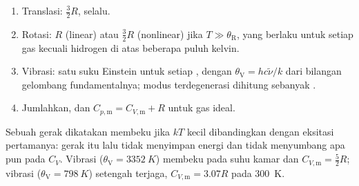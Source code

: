 \begin{method}\label{met:b3:statistical-thermo-applied:cv}
\begin{enumerate}
  \item Translasi: $\frac32R$, selalu.
  \item Rotasi: $R$ (linear) atau $\frac32R$ (nonlinear) jika $T \gg \theta_{\mathrm R}$,
        yang berlaku untuk setiap gas kecuali hidrogen di atas beberapa puluh
        kelvin.
  \item Vibrasi: satu suku Einstein untuk setiap , dengan
        $\theta_{\mathrm V} = hc\tilde\nu/k$ dari bilangan gelombang fundamentalnya;
        modus terdegenerasi dihitung sebanyak .
  \item Jumlahkan, dan $C_{p,\mathrm m} = C_{V,\mathrm m} + R$ untuk gas ideal.
\end{enumerate}
\end{method}

Sebuah gerak dikatakan membeku jika $kT$ kecil dibandingkan dengan eksitasi
pertamanya: gerak itu lalu tidak menyimpan energi dan tidak menyumbang apa
pun pada $C_V$. Vibrasi  ($\theta_{\mathrm V} = \qty{3352}{K}$) membeku pada suhu
kamar dan $C_{V,\mathrm m} = \frac52R$; vibrasi  ($\theta_{\mathrm V} = \qty{798}{K}$)
setengah terjaga, $C_{V,\mathrm m} = 3.07R$ pada \qty{300}{K}.

